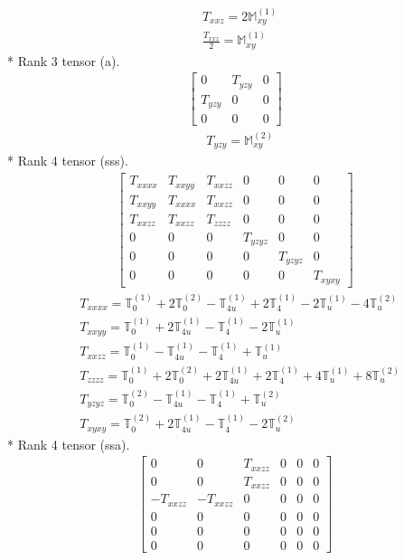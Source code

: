 \documentclass[fleqn,8pt,landscape]{jsarticle}
\begin{document}
\begin{align*}
& T_{xxz} = 2 \mathbb{M}_{xy}^{(1)} \\
& \frac{T_{xxz}}{2} = \mathbb{M}_{xy}^{(1)}
\end{align*}
* Rank 3 tensor (a).
\begin{align*}
\begin{bmatrix} 0 & T_{yzy} & 0 \\ T_{yzy} & 0 & 0 \\ 0 & 0 & 0 \end{bmatrix}
\end{align*}
\begin{align*}
& T_{yzy} = \mathbb{M}_{xy}^{(2)}
\end{align*}
* Rank 4 tensor (sss).
\begin{align*}
\begin{bmatrix} T_{xxxx} & T_{xxyy} & T_{xxzz} & 0 & 0 & 0 \\ T_{xxyy} & T_{xxxx} & T_{xxzz} & 0 & 0 & 0 \\ T_{xxzz} & T_{xxzz} & T_{zzzz} & 0 & 0 & 0 \\ 0 & 0 & 0 & T_{yzyz} & 0 & 0 \\ 0 & 0 & 0 & 0 & T_{yzyz} & 0 \\ 0 & 0 & 0 & 0 & 0 & T_{xyxy} \end{bmatrix}
\end{align*}
\begin{align*}
& T_{xxxx} = \mathbb{T}_{0}^{(1)} + 2 \mathbb{T}_{0}^{(2)} - \mathbb{T}_{4u}^{(1)} + 2 \mathbb{T}_{4}^{(1)} - 2 \mathbb{T}_{u}^{(1)} - 4 \mathbb{T}_{u}^{(2)} \\
& T_{xxyy} = \mathbb{T}_{0}^{(1)} + 2 \mathbb{T}_{4u}^{(1)} - \mathbb{T}_{4}^{(1)} - 2 \mathbb{T}_{u}^{(1)} \\
& T_{xxzz} = \mathbb{T}_{0}^{(1)} - \mathbb{T}_{4u}^{(1)} - \mathbb{T}_{4}^{(1)} + \mathbb{T}_{u}^{(1)} \\
& T_{zzzz} = \mathbb{T}_{0}^{(1)} + 2 \mathbb{T}_{0}^{(2)} + 2 \mathbb{T}_{4u}^{(1)} + 2 \mathbb{T}_{4}^{(1)} + 4 \mathbb{T}_{u}^{(1)} + 8 \mathbb{T}_{u}^{(2)} \\
& T_{yzyz} = \mathbb{T}_{0}^{(2)} - \mathbb{T}_{4u}^{(1)} - \mathbb{T}_{4}^{(1)} + \mathbb{T}_{u}^{(2)} \\
& T_{xyxy} = \mathbb{T}_{0}^{(2)} + 2 \mathbb{T}_{4u}^{(1)} - \mathbb{T}_{4}^{(1)} - 2 \mathbb{T}_{u}^{(2)}
\end{align*}
* Rank 4 tensor (ssa).
\begin{align*}
\begin{bmatrix} 0 & 0 & T_{xxzz} & 0 & 0 & 0 \\ 0 & 0 & T_{xxzz} & 0 & 0 & 0 \\ - T_{xxzz} & - T_{xxzz} & 0 & 0 & 0 & 0 \\ 0 & 0 & 0 & 0 & 0 & 0 \\ 0 & 0 & 0 & 0 & 0 & 0 \\ 0 & 0 & 0 & 0 & 0 & 0 \end{bmatrix}
\end{align*}
\end{document}
